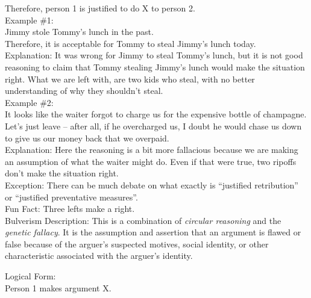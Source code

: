 \documentclass[a4paper,12pt,single,pdftex]{scrartcl}
\begin{document}
    
      Therefore, person 1 is justified to do X to person 2.
    \\

    
      Example \#1:
    \\

    
      Jimmy stole Tommy’s lunch in the past.
    \\

    
      Therefore, it is acceptable for Tommy to steal Jimmy’s lunch today.
    \\

    
      Explanation: It was wrong for Jimmy to steal Tommy’s lunch, but it is not good reasoning to claim that Tommy stealing Jimmy’s lunch would make the situation right.  What we are left with, are two kids who steal, with no better understanding of why they shouldn’t steal.
    \\

    
      Example \#2:
    \\

    
      It looks like the waiter forgot to charge us for the expensive bottle of champagne.  Let’s just leave -- after all, if he overcharged us, I doubt he would chase us down to give us our money back that we overpaid.
    \\

    
      Explanation: Here the reasoning is a bit more fallacious because we are making an assumption of what the waiter might do.  Even if that were true, two ripoffs don’t make the situation right.
    \\

    
      Exception: There can be much debate on what exactly is “justified retribution” or “justified preventative measures”.
    \\

    
      Fun Fact: Three lefts make a right.
    \\

  

Bulverism
    Description: This is a combination of {\it circular reasoning}  and the {\it genetic fallacy}. It is the assumption and assertion that an argument is flawed or false because of the arguer's suspected motives, social identity, or other characteristic associated with the arguer's identity.

    
      Logical Form:
    \\

    
      Person 1 makes argument X.
    \\
\end{document}
